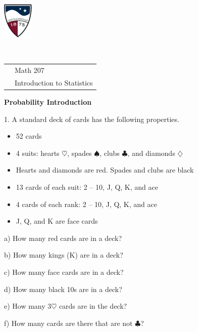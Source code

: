 \documentclass[10pt]{article}
\begin{document}
\pagestyle{empty}
\lstset{language=R, showspaces=false, showstringspaces=false}

\href{http://www.su.edu}{\includegraphics[height=1.75cm]{sulogo.eps}}
\vspace{-1.79cm}

{{\ }\hfill\small
\begin{tabular}{cl}
& Math 207\\
& Introduction to Statistics\\
\end{tabular}
}
\setlength{\baselineskip}{1.05\baselineskip}

\begin{center}
\textbf{\large  Probability Introduction}
\end{center}

1. A standard deck of cards has the following properties.
\begin{itemize}
\item 52 cards
\item 4 suits:  hearts $\heartsuit$, spades $\spadesuit$, clubs $\clubsuit$,
  and diamonds $\diamondsuit$
\item Hearts and diamonds are red.  Spades and clubs are black
\item 13 cards of each suit:  2 -- 10, J, Q, K, and ace
\item 4 cards of each rank:  2 -- 10, J, Q, K, and ace
\item J, Q, and K are face cards
\end{itemize}
\medskip

\hspace{10pt} a) How many red cards are in a deck?
\medskip

\hspace{10pt} b) How many kings (K) are in a deck?
\medskip

\hspace{10pt} c) How many face cards are in a deck?
\medskip

\hspace{10pt} d) How many black 10s are in a deck?
\medskip

\hspace{10pt} e) How many 3$\heartsuit$ cards are in the deck?
\medskip

\hspace{10pt} f) How many cards are there that are not $\clubsuit$?
\medskip
\bigskip
\end{document}
